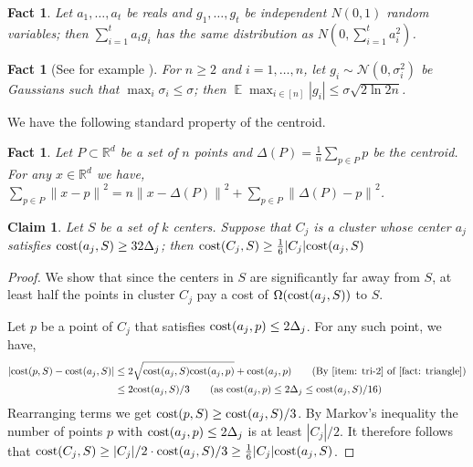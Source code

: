 \documentclass[11pt]{article}
\newtheorem{claim}[lemma]{Claim}
\newtheorem{fact}[lemma]{Fact}
\theoremstyle{restate}
\theoremstyle{definition}
\newcommand{\R}{\ensuremath{\mathbb{R}}}
\newcommand{\norm}[1]{\ensuremath{\|#1\|}}
\newcommand{\E}{\mathop{\mathbb{E}}}
\newcommand{\cost}{\textnormal{cost}}
\begin{document}
\begin{fact}\label{fact: gaussian}
    Let $a_1, \ldots, a_t$ be reals and $g_1, \ldots, g_t$ be independent $N(0,1)$ random variables; then $\sum_{i=1}^t {a_i g_i}$ has the same distribution as $ N(0, \sum_{i=1}^t a_i^2)$.
\end{fact}

\begin{fact} [See for example \cite{kamath2015bounds}]\label{fact: max-of-gaussians}
	For $n \geq 2$ and $i = 1,\ldots, n$, let $g_i \sim \mathcal{N}(0,\sigma_i^2)$ be Gaussians such that $\max_i \sigma_i \leq \sigma$; then $\E \max_{i \in [n]} |g_i|\leq \sigma\sqrt{2\ln 2n}$.
\end{fact}

We have the following standard property of the centroid.
\begin{fact}\label{lem: centroid-fact}
    Let $P \subset \R^d$ be a set of $n$ points and $\Delta(P) = \tfrac{1}{n}\sum_{p \in P} p$ be the centroid. For any $x \in \R^d$ we have,
    $\sum_{p \in P} \norm{x - p}^2 = n \norm{x - \Delta(P)}^2 + \sum_{p \in P} \norm{\Delta(P) - p}^2 $.
\end{fact}

\begin{claim}
    Let $S$ be a set of $k$ centers. Suppose that $C_j$ is a cluster whose center $a_j$ satisfies $\cost(a_j,S) \geq 32\Delta_j$; then $\cost(C_j,S) \geq \tfrac{1}{6}  |C_j| \cost(a_j,S)$
\end{claim}
\begin{proof}
    We show that since the centers in $S$ are significantly far away from $S$, at least half the points in cluster $C_j$ pay a cost of $\Omega(\cost(a_j,S))$ to $S$.
    
    Let $p$ be a point of $C_j$ that satisfies $\cost(a_j,p) \leq 2\Delta_j$. For any such point, we have,
    \begin{align*}
        |\cost(p,S)- \cost(a_j,S)| &\leq 2 \sqrt{\cost(a_j,S) \cost(a_j,p)} + \cost(a_j,p) \tag{By \Cref{item: tri-2} of \Cref{fact: triangle}}\\
        &\leq 2\cost(a_j,S)/3 \tag{as $\cost(a_j,p) \leq 2 \Delta_j \leq \cost(a_j,S)/16$}
    \end{align*}
    Rearranging terms we get $\cost(p,S) \geq \cost(a_j,S)/3$. By Markov's inequality the number of points $p$ with $\cost(a_j,p) \leq 2 \Delta_j$ is at least $|C_j|/2$. It therefore follows that $\cost(C_j,S) \geq |C_j|/2 \cdot \cost(a_j,S)/3 \geq \tfrac{1}{6} |C_j| \cost(a_j,S)$.
\end{proof}
\end{document}
